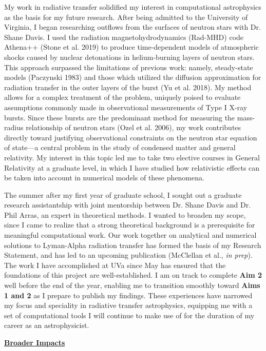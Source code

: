 \documentclass[11pt]{article}
\begin{document}
My work in radiative transfer solidified my interest in computational astrophysics as the basis for my future research. After being admitted to the University of Virginia, I began researching outflows from the surfaces of neutron stars with Dr. Shane Davis. I used the radiation magnetohydrodynamics (Rad-MHD) code Athena++ (Stone et al. 2019) to produce time-dependent models of atmospheric shocks caused by nuclear detonations in helium-burning layers of neutron stars. This approach surpassed the limitations of previous work: namely, steady-state models (Paczynski 1983) and those which utilized the diffusion approximation for radiation transfer in the outer layers of the burst (Yu et al. 2018). My method allows for a complex treatment of the problem, uniquely poised to evaluate assumptions commonly made in observational measurements of Type I X-ray bursts. Since these bursts are the predominant method for measuring the mass-radius relationship of neutron stars (Ozel et al. 2006), my work contributes directly toward justifying observational constraints on the neutron star equation of state---a central problem in the study of condensed matter and general relativity. My interest in this topic led me to take two elective courses in General Relativity at a graduate level, in which I have studied how relativistic effects can be taken into account in numerical models of these phenomena.

The summer after my first year of graduate school, I sought out a graduate research assistantship with joint mentorship between Dr. Shane Davis and Dr. Phil Arras, an expert in theoretical methods. I wanted to broaden my scope, since I came to realize that a strong theoretical background is a prerequisite for meaningful computational work. Our work together on analytical and numerical solutions to Lyman-Alpha radiation transfer has formed the basis of my Research Statement, and has led to an upcoming publication (McClellan et al., \textit{in prep}). The work I have accomplished at UVa since May has ensured that the foundations of this project are well-established. I am on track to complete \textbf{Aim 2} well before the end of the year, enabling me to transition smoothly toward \textbf{Aims 1 and 2} as I prepare to publish my findings. These experiences have narrowed my focus and speciality in radiative transfer astrophysics, equipping me with a set of computational tools I will continue to make use of for the duration of my career as an astrophysicist.

\thispagestyle{empty}
\noindent \textbf{\underline{Broader Impacts}} 
\end{document}
